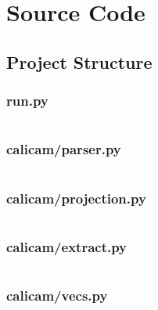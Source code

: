 \section{Source Code}

\subsection*{Project Structure}


\singlespacing

\subsubsection*{run.py} \label{code:run}
\inputminted{python}{./calicam/run.py}

\subsubsection*{calicam/parser.py} \label{code:parser}
\inputminted{python}{./calicam/calicam/parser.py}

\subsubsection*{calicam/projection.py} \label{code:projection}
\inputminted{python}{./calicam/calicam/projection.py}

\subsubsection*{calicam/extract.py} \label{code:extract}
\inputminted{python}{./calicam/calicam/extract.py}

\subsubsection*{calicam/vecs.py} \label{code:vecsZ}
\inputminted{python}{./calicam/calicam/vecs.py}

\onehalfspacing
